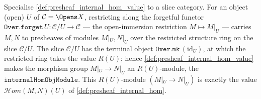 \begin{definition}\leanok
  \label{def:presheaf_internal_hom_slice_value}
  Specialise \cref{def:presheaf_internal_hom_value} to a slice category. For an object
  (open) \(U\) of \(\mathcal{C} = \Opens X\), restricting along the forgetful functor
  \(\mathtt{Over.forget}\,U : \mathcal{C}/U \to \mathcal{C}\) --- the open-immersion
  restriction \(M \mapsto M|_U\) --- carries \(M, N\) to presheaves of modules
  \(M|_U, N|_U\) over the restricted structure ring on the slice \(\mathcal{C}/U\). The
  slice \(\mathcal{C}/U\) has the terminal object \(\mathtt{Over.mk}\,(\mathrm{id}_U)\),
  at which the restricted ring takes the value \(R(U)\); hence
  \cref{def:presheaf_internal_hom_value} makes the morphism group
  \(M|_U \longrightarrow N|_U\) an \(R(U)\)-module, the
  \(\mathtt{internalHomObjModule}\). This \(R(U)\)-module \((M|_U \to N|_U)\) is exactly
  the value \(\mathcal{H}om(M, N)(U)\) of \cref{def:presheaf_internal_hom}.
\end{definition}

